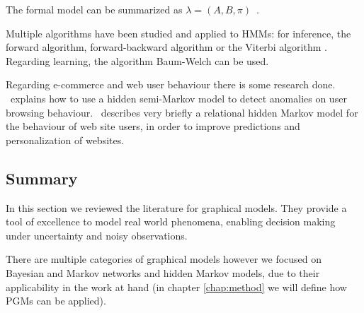 The formal model can be summarized as $ \lambda = (A, B, \pi) 
$~\cite{Rabiner1989}.

Multiple algorithms have been studied and applied to HMMs: for inference, the 
forward algorithm, forward-backward algorithm \cite{baum1967inequality} or the 
Viterbi algorithm \cite{forney2005viterbi, martin2000speech}. Regarding 
learning, the algorithm Baum-Welch \cite{Baum1966, baum1967inequality} can be 
used.

Regarding e-commerce and web user behaviour there is some research done. 
\cite{Xie2009}~explains how to use a hidden semi-Markov model to detect 
anomalies on user browsing behaviour. \cite{Anderson2002}~describes very 
briefly a relational hidden Markov model for the behaviour of web site users, 
in order to improve predictions and personalization of websites.

\subsection{Summary}

In this section we reviewed the literature for graphical models. They provide a 
tool of excellence to model real world phenomena, enabling decision making 
under uncertainty and noisy observations.

There are multiple categories of graphical models however we focused on 
Bayesian and Markov networks and hidden Markov models, due to their 
applicability in the work at hand (in chapter \ref{chap:method} we will define 
how PGMs can be applied).
